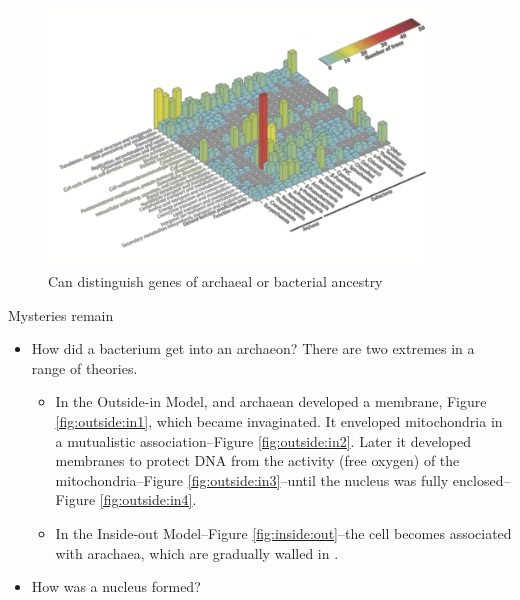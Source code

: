\documentclass[]{article}
\begin{document}
\begin{figure}[H]
	\caption{Can distinguish genes of archaeal or bacterial ancestry}
	\label{fig:distinguish:genes:archaeal:bacterial}
	\includegraphics[width=0.9\textwidth]{thiergart2012}
\end{figure}

Mysteries remain
\begin{itemize}
	\item How did a bacterium get into an archaeon? There are two extremes in a range of theories.
	\begin{itemize}
		\item In the Outside-in Model, and archaean developed a membrane, Figure \ref{fig:outside:in1}, which became invaginated. It enveloped mitochondria in a mutualistic association--Figure \ref{fig:outside:in2}. Later it developed membranes to protect DNA from the activity (free oxygen) of the mitochondria--Figure \ref{fig:outside:in3}--until the nucleus was fully enclosed--Figure \ref{fig:outside:in4}.
		\item In the Inside-out Model--Figure \ref{fig:inside:out}--the cell becomes associated with arachaea, which are gradually walled in \cite{baum2014inside}.
	\end{itemize}
	\item How was a nucleus formed?
\end{itemize}
\end{document}
